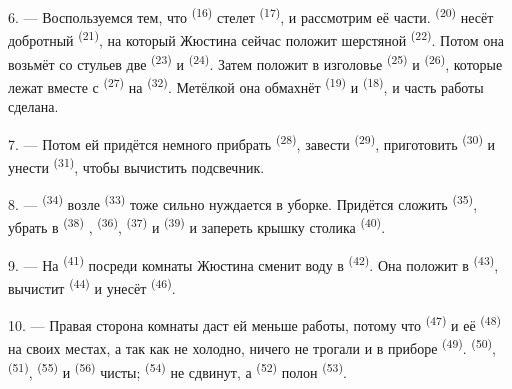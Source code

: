 6. --- Воспользуемся тем, что  \textsuperscript{(16)} стелет
 \textsuperscript{(17)}, и рассмотрим её части. 
\textsuperscript{(20)} несёт добротный  \textsuperscript{(21)},
на который Жюстина сейчас положит шерстяной  \textsuperscript{(22)}.
Потом она возьмёт со стульев две  \textsuperscript{(23)} и
 \textsuperscript{(24)}. Затем положит в изголовье 
\textsuperscript{(25)} и  \textsuperscript{(26)}, которые лежат вместе с
 \textsuperscript{(27)} на 
\textsuperscript{(32)}. Метёлкой она обмахнёт  \textsuperscript{(19)} и
 \textsuperscript{(18)}, и часть работы сделана.

7. --- Потом ей придётся немного прибрать 
\textsuperscript{(28)}, завести  \textsuperscript{(29)}, приготовить
 \textsuperscript{(30)} и унести  \textsuperscript{(31)},
чтобы вычистить подсвечник.

\VUsaut{5.0mm}
\VUsaut{3.0mm}

8. ---  \textsuperscript{(34)} возле 
\textsuperscript{(33)} тоже сильно нуждается в уборке. Придётся сложить
 \textsuperscript{(35)}, убрать в 
\textsuperscript{(38)} ,  \textsuperscript{(36)},
 \textsuperscript{(37)} и  \textsuperscript{(39)} и
запереть крышку столика  \textsuperscript{(40)}.

9. --- На  \textsuperscript{(41)} посреди комнаты Жюстина
сменит воду в  \textsuperscript{(42)}. Она положит 
в  \textsuperscript{(43)}, вычистит 
\textsuperscript{(44)} и унесёт  \textsuperscript{(46)}.

10. --- Правая сторона комнаты даст ей меньше работы, потому что
 \textsuperscript{(47)} и её  \textsuperscript{(48)}
на своих местах, а так как не холодно, ничего не трогали и в приборе
 \textsuperscript{(49)}.  \textsuperscript{(50)},
 \textsuperscript{(51)},  \textsuperscript{(55)} и
 \textsuperscript{(56)} чисты; 
\textsuperscript{(54)} не сдвинут, а  \textsuperscript{(52)}
полон  \textsuperscript{(53)}.

